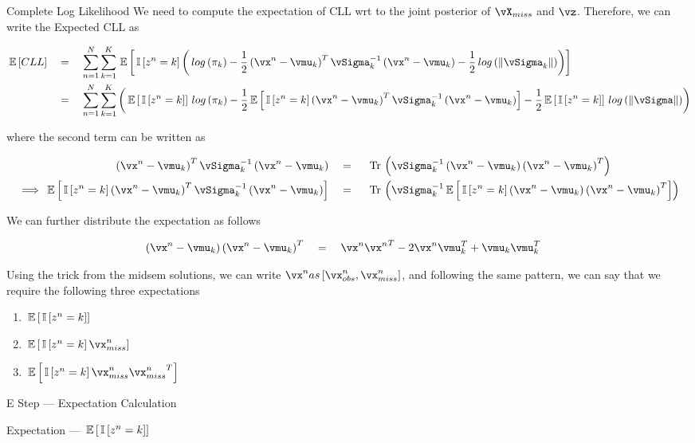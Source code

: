 \documentclass{article}
\begin{document}
\begin{question}
\begin{qsection}{Complete Log Likelihood}
		We need to compute the expectation of CLL wrt to the joint posterior of $\vX_{miss}$ and $\vz$. Therefore, we can write the Expected CLL as

		\begin{align*}
			\E{CLL}		&\eq	\sum_{n = 1}^{N} \sum_{k = 1}^{K} \E{\is{z^n = k} \para{\log{\pi_k} - \frac{1}{2} \para{\vx^n - \vmu_k}^T \vSigma_k^{-1} \para{\vx^n - \vmu_k} - \frac{1}{2} \log{\norm{\vSigma_k}}}} \\
						&\eq	\sum_{n = 1}^{N} \sum_{k = 1}^{K} \para{\E{\is{z^n = k}} \log{\pi_k} - \frac{1}{2} \E{\is{z^n = k} \para{\vx^n - \vmu_k}^T \vSigma_k^{-1} \para{\vx^n - \vmu_k}} - \frac{1}{2} \E{\is{z^n = k}} \log{\norm{\vSigma}}}
		\end{align*}

		where the second term can be written as

		\begin{align*}
			\para{\vx^n - \vmu_k}^T \vSigma_k^{-1} \para{\vx^n - \vmu_k}				&\eq	\trace{\vSigma_k^{-1} \para{\vx^n - \vmu_k} \para{\vx^n - \vmu_k}^T} \\
			\implies \E{\is{z^n = k} \para{\vx^n - \vmu_k}^T \vSigma_k^{-1} \para{\vx^n - \vmu_k}}	&\eq	\trace{\vSigma_k^{-1} \E{\is{z^n = k} \para{\vx^n - \vmu_k} \para{\vx^n - \vmu_k}^T}}
		\end{align*}

		We can further distribute the expectation as follows

		\begin{align*}
			\para{\vx^n - \vmu_k} \para{\vx^n - \vmu_k}^T	&\eq	\vx^n {\vx^n}^T - 2 \vx^n \vmu_k^T + \vmu_k \vmu_k^T
		\end{align*}

		Using the trick from the midsem solutions, we can write $\vx^n as \brac{\vx_{obs}^n, \vx_{miss}^n}$, and following the same pattern, we can say that we require the following three expectations
		\begin{enumerate}
			\item $\E{\is{z^n = k}}$
			\item $\E{\is{z^n = k} \vx_{miss}^n}$
			\item $\E{\is{z^n = k} \vx_{miss}^n {\vx_{miss}^n}^T}$
		\end{enumerate}
		
	\end{qsection}

	\begin{qsection}{E Step --- Expectation Calculation}

		\begin{qsubsection}{Expectation --- $\E{\is{z^n = k}}$}


\end{qsubsection}
\end{qsection}
\end{question}
\end{document}
